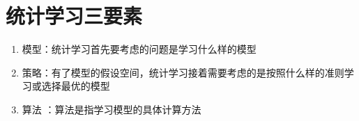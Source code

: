 \section{统计学习三要素}
\begin{enumerate}[(1)]
	\item 模型：统计学习首先要考虑的问题是学习什么样的模型
	\item 策略：有了模型的假设空间，统计学习接着需要考虑的是按照什么样的准则学习或选择最优的模型
	\item 算法 ：算法是指学习模型的具体计算方法
\end{enumerate}